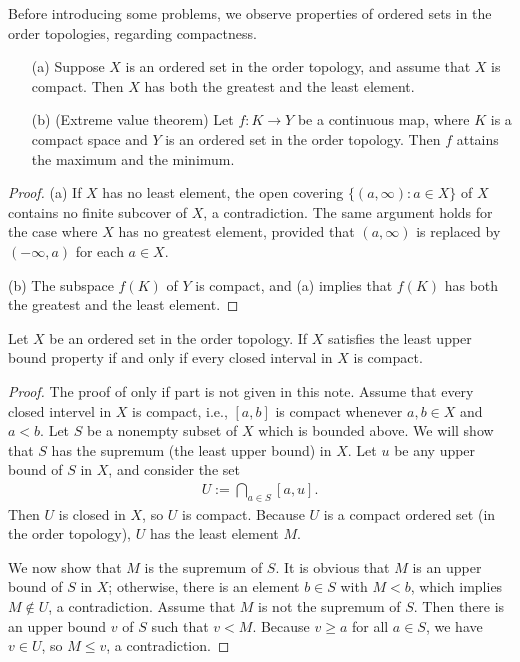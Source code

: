 Before introducing some problems, we observe properties of ordered sets in the order topologies, regarding compactness.
\begin{prop}
    \begin{enumerate}
        \item[(a)]
        {
            Suppose $X$ is an ordered set in the order topology, and assume that $X$ is compact.
            Then $X$ has both the greatest and the least element.
        }
        \item[(b)]
        {
            (Extreme value theorem)
            Let $f: K\rightarrow Y$ be a continuous map, where $K$ is a compact space and $Y$ is an ordered set in the order topology.
            Then $f$ attains the maximum and the minimum.
        }
    \end{enumerate}
\end{prop}
\begin{proof}
    \hangindent=0.65cm
    (a)
    If $X$ has no least element, the open covering $\{(a, \infty): a\in X\}$ of $X$ contains no finite subcover of $X$, a contradiction.
    The same argument holds for the case where $X$ has no greatest element, provided that $(a, \infty)$ is replaced by $(-\infty, a)$ for each $a\in X$.

    \noindent(b)
    The subspace $f(K)$ of $Y$ is compact, and (a) implies that $f(K)$ has both the greatest and the least element.
\end{proof}
\begin{prop}
    Let $X$ be an ordered set in the order topology.
    If $X$ satisfies the least upper bound property if and only if every closed interval in $X$ is compact.
\end{prop}
\begin{proof}
    \color{red}The proof of only if part is not given in this note. \color{black}
    Assume that every closed intervel in $X$ is compact, i.e., $[a, b]$ is compact whenever $a, b\in X$ and $a<b$.
    Let $S$ be a nonempty subset of $X$ which is bounded above.
    We will show that $S$ has the supremum (the least upper bound) in $X$.
    Let $u$ be any upper bound of $S$ in $X$, and consider the set
    \begin{align*}
        U:=\bigcap_{a\in S}[a, u].
    \end{align*}
    Then $U$ is closed in $X$, so $U$ is compact.
    Because $U$ is a compact ordered set (in the order topology), $U$ has the least element $M$.
    
    We now show that $M$ is the supremum of $S$.
    It is obvious that $M$ is an upper bound of $S$ in $X$; otherwise, there is an element $b\in S$ with $M<b$, which implies $M\notin U$, a contradiction.
    Assume that $M$ is not the supremum of $S$.
    Then there is an upper bound $v$ of $S$ such that $v<M$.
    Because $v\geq a$ for all $a\in S$, we have $v\in U$, so $M\leq v$, a contradiction.
\end{proof}

